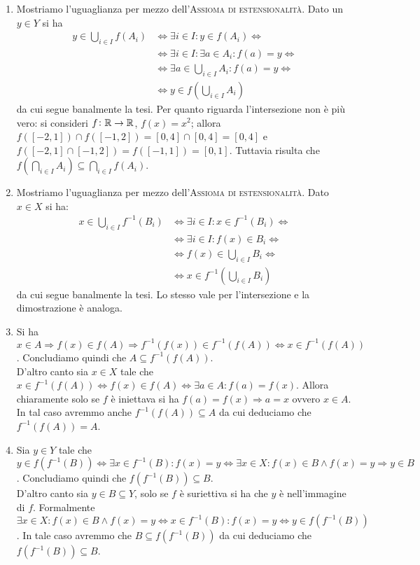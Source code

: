 \begin{enumerate}
\item Mostriamo l'uguaglianza per mezzo dell'\textsc{Assioma di estensionalità}. Dato un $ y \in Y $ si ha
  \begin{align*}
    y \in \bigcup_{i \in I} f(A_i) & \iff \exists i \in I : y \in f(A_i) \iff \\
                                   & \iff \exists i \in I : \exists a \in A_i : f(a) = y \iff \\
                                   & \iff \exists a \in \bigcup_{i \in I} A_i : f(a) = y \iff \\
                                   & \iff y \in f \left (\bigcup_{i \in I} A_i \right )
  \end{align*}
  da cui segue banalmente la tesi. Per quanto riguarda l'intersezione non è più vero: si consideri $ f \colon \mathbb{R} \to \mathbb{R} $, $ f(x) = x^2 $; allora $ f([-2, 1]) \cap f([-1, 2]) = [0, 4] \cap [0, 4] = [0, 4] $ e $ f([-2, 1] \cap [-1, 2]) = f([-1, 1]) = [0, 1] $. Tuttavia risulta che $ f \left (\bigcap_{i \in I} A_i \right ) \subseteq \bigcap_{i \in I} f(A_i) $.
\item Mostriamo l'uguaglianza per mezzo dell'\textsc{Assioma di estensionalità}. Dato $ x \in X $ si ha:
  \begin{align*}
    x \in \bigcup_{i \in I} f^{-1}(B_i) & \iff \exists i \in I : x \in f^{-1}(B_i) \iff \\
                                        & \iff \exists i \in I : f(x) \in B_i \iff \\
                                        & \iff f(x) \in \bigcup_{i \in I} B_i \iff \\
                                        & \iff x \in f^{-1} \left (\bigcup_{i \in I} B_i \right )
  \end{align*}
  da cui segue banalmente la tesi. Lo stesso vale per l'intersezione e la dimostrazione è analoga.
\item Si ha $ x \in A \Rightarrow f(x) \in f(A) \Rightarrow f^{-1}(f(x)) \in f^{-1}(f(A)) \iff x \in f^{-1}(f(A)) $. Concludiamo quindi che $ A \subseteq f^{-1}(f(A)) $. \\
  D'altro canto sia $ x \in X $ tale che $ x \in f^{-1}(f(A)) \iff f(x) \in f(A) \iff \exists a \in A : f(a) = f(x) $. Allora chiaramente solo se $ f $ è iniettava si ha $ f(a) = f(x) \Rightarrow a = x $ ovvero $ x \in A $. In tal caso avremmo anche $ f^{-1}(f(A)) \subseteq A $ da cui deduciamo che $ f^{-1}(f(A)) = A $.
\item Sia $ y \in Y $ tale che $ y \in f(f^{-1}(B)) \iff \exists x \in f^{-1}(B) : f(x) = y \iff \exists x \in X : f(x) \in B \wedge f(x) = y \Rightarrow y \in B $. Concludiamo quindi che $ f(f^{-1}(B)) \subseteq B $. \\
  D'altro canto sia $ y \in B \subseteq Y $, solo se $ f $ è suriettiva si ha che $ y $ è nell'immagine di $ f $. Formalmente $ \exists x \in X : f(x) \in B \wedge f(x) = y \iff x \in f^{-1}(B) : f(x) = y \iff y \in f(f^{-1}(B)) $. In tale caso avremmo che $ B \subseteq f(f^{-1}(B)) $ da cui deduciamo che $ f(f^{-1}(B)) \subseteq B $.
\end{enumerate}


